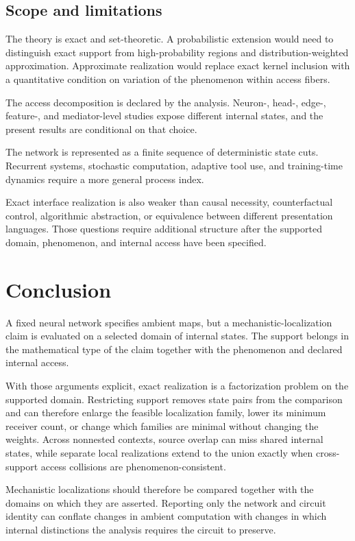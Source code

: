 \subsection{Scope and limitations}

The theory is exact and set-theoretic. A probabilistic extension would need to distinguish exact support from high-probability regions and distribution-weighted approximation. Approximate realization would replace exact kernel inclusion with a quantitative condition on variation of the phenomenon within access fibers.

The access decomposition is declared by the analysis. Neuron-, head-, edge-, feature-, and mediator-level studies expose different internal states, and the present results are conditional on that choice.

The network is represented as a finite sequence of deterministic state cuts. Recurrent systems, stochastic computation, adaptive tool use, and training-time dynamics require a more general process index.

Exact interface realization is also weaker than causal necessity, counterfactual control, algorithmic abstraction, or equivalence between different presentation languages. Those questions require additional structure after the supported domain, phenomenon, and internal access have been specified.

\section{Conclusion}

A fixed neural network specifies ambient maps, but a mechanistic-localization claim is evaluated on a selected domain of internal states. The support belongs in the mathematical type of the claim together with the phenomenon and declared internal access.

With those arguments explicit, exact realization is a factorization problem on the supported domain. Restricting support removes state pairs from the comparison and can therefore enlarge the feasible localization family, lower its minimum receiver count, or change which families are minimal without changing the weights. Across nonnested contexts, source overlap can miss shared internal states, while separate local realizations extend to the union exactly when cross-support access collisions are phenomenon-consistent.

Mechanistic localizations should therefore be compared together with the domains on which they are asserted. Reporting only the network and circuit identity can conflate changes in ambient computation with changes in which internal distinctions the analysis requires the circuit to preserve.
